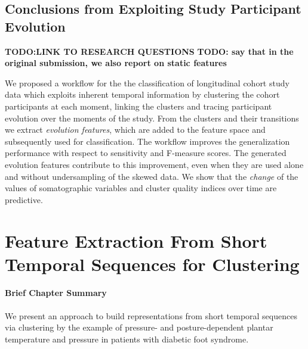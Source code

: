 \documentclass[
  oneside]{book}
\newenvironment{infobox}[1]
  {
  \begin{chapter-summary}
  }
  {
  \end{chapter-summary}
  }
\begin{document}
\hypertarget{evo-conclusions}{%
\section{Conclusions from Exploiting Study Participant Evolution}\label{evo-conclusions}}

\textbf{TODO:LINK TO RESEARCH QUESTIONS}
\textbf{TODO: say that in the original submission, we also report on static features}

We proposed a workflow for the the classification of longitudinal cohort study data which exploits inherent temporal information by clustering the cohort participants at each moment, linking the clusters and tracing participant evolution over the moments of the study.
From the clusters and their transitions we extract \emph{evolution features}, which are added to the feature space and subsequently used for classification.
The workflow improves the generalization performance with respect to sensitivity and F-measure scores.
The generated evolution features contribute to this improvement, even when they are used alone and without undersampling of the skewed data.
We show that the \emph{change} of the values of somatographic variables and cluster quality indices over time are predictive.

\hypertarget{diabfoot}{%
\chapter{Feature Extraction From Short Temporal Sequences for Clustering}\label{diabfoot}}

\begin{infobox}{tasks.pdf}

\hypertarget{brief-chapter-summary-4}{%
\subsubsection*{Brief Chapter Summary}\label{brief-chapter-summary-4}}

We present an approach to build representations from short temporal sequences via clustering by the example of pressure- and posture-dependent plantar temperature and pressure in patients with diabetic foot syndrome.

\end{infobox}
\end{document}
